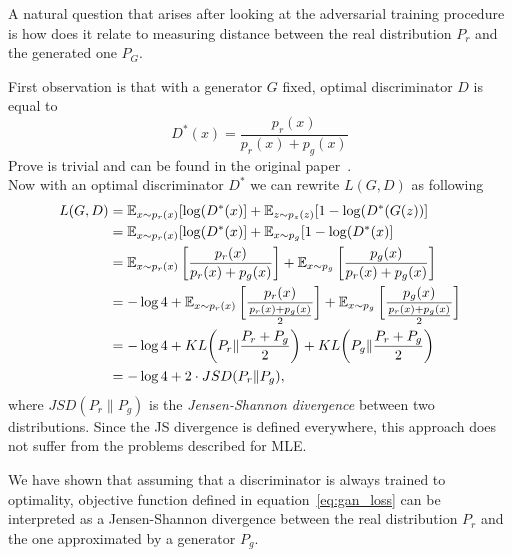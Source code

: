 \indent A natural question that arises after looking at the adversarial training procedure is how does it relate to measuring distance between the real distribution $P_r$ and the generated one $P_G$. 

First observation is that with a generator $G$ fixed, optimal discriminator $D$ is equal to
\begin{equation}
	D^*(x) = \frac{p_r(x)}{p_r(x) + p_g(x)}
\end{equation}
Prove is trivial and can be found in the original paper~\citep{gan}.\\
Now with an optimal discriminator $D^*$ we can rewrite $L(G,D)$ as following
\begin{align*}
	L(G, D) &= \operatorname{\mathbb{E}}_{x \sim p_r(x)} [\log(D^*(x)] + \operatorname{\mathbb{E}}_{z \sim p_z(z)}[1-\log(D^*(G(z))] \\
	&= \operatorname{\mathbb{E}}_{x \sim p_r(x)} [\log(D^*(x)] + \operatorname{\mathbb{E}}_{x \sim p_g}[1-\log(D^*(x)] \\
	&= \operatorname{\mathbb{E}}_{x \sim p_r(x)} \bigg[\frac{p_r(x)}{p_r(x) + p_g(x)}\bigg] + \operatorname{\mathbb{E}}_{x \sim p_g}\bigg[\frac{p_g(x)}{p_r(x) + p_g(x)}\bigg] \\
	&= -\log 4 + \operatorname{\mathbb{E}}_{x \sim p_r(x)} \bigg[\frac{p_r(x)}{\frac{p_r(x) + p_g(x)}{2}}\bigg] + \operatorname{\mathbb{E}}_{x \sim p_g}\bigg[\frac{p_g(x)}{\frac{p_r(x) + p_g(x)}{2}}\bigg] \\
	&= -\log 4 + KL\bigg(P_r \lVert \frac{P_r + P_g}{2}\bigg) +  KL\bigg(P_g \lVert \frac{P_r + P_g}{2}\bigg) \\
	&= -\log 4 + 2 \cdot JSD(P_r \lVert P_g),
\end{align*}
where $JSD(P_r \lVert P_g)$ is the \textit{Jensen-Shannon divergence} between two distributions. Since the JS divergence is defined everywhere, this approach does not suffer from the problems described for MLE.

\indent We have shown that assuming that a discriminator is always trained to optimality, objective function defined in equation~\ref{eq:gan_loss} can be interpreted as a Jensen-Shannon divergence between the real distribution $P_r$ and the one approximated by a generator $P_g$. 

